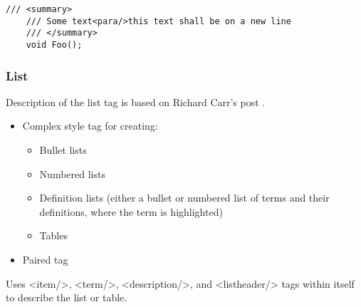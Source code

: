 \begin{lstlisting}[caption=Para tag]
    /// <summary>
    /// Some text<para/>this text shall be on a new line
    /// </summary>
    void Foo();
\end{lstlisting}

\subsubsection*{List} \label{sec:listTag}

Description of the list tag is based on Richard Carr's post \cite{carr_adding_2012}.

\begin{itemize}
    \item Complex style tag for creating:
    \begin{itemize}
        \item Bullet lists
        \item Numbered lists
        \item Definition lists (either a bullet or numbered list of terms and their definitions, where the term is highlighted)
        \item Tables
    \end{itemize}
    \item Paired tag
\end{itemize}

Uses <item/>, <term/>, <description/>, and <listheader/> tags within itself to describe the list or table.

